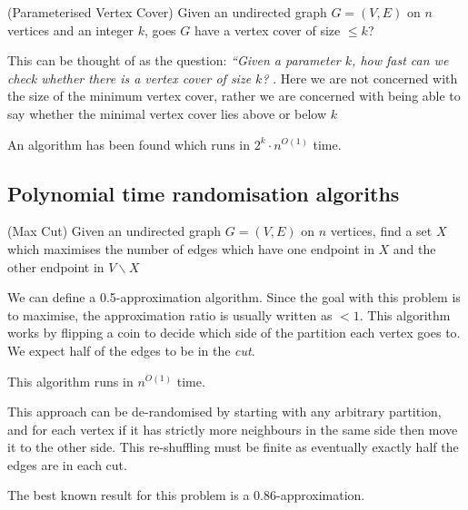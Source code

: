 \documentclass{article}
\begin{document}
\begin{definition}(Parameterised Vertex Cover)
 Given an undirected graph $G=(V,E)$ on $n$ vertices and an integer $k$, goes $G$ have a vertex cover of size $\leq k$?
\end{definition}

This can be thought of as the question: \textit{``Given a parameter $k$, how fast can we check whether there is a vertex cover of size $k$?} . Here we are not concerned with the size of the minimum vertex cover, rather we are concerned with being able to say whether the minimal vertex cover lies above or below $k$

An algorithm has been found which runs in $2^{k}\cdot n^{O(1)}$ time.

\subsection{Polynomial time randomisation algoriths}

\begin{definition}(Max Cut)
  Given an undirected graph $G=(V,E)$ on $n$ vertices, find a set $X$ which maximises the number of edges which have one endpoint in $X$ and the other endpoint in $V \backslash X$
\end{definition}


We can define a 0.5-approximation algorithm. Since the goal with this problem is to maximise, the approximation ratio is usually written as $<1$. This algorithm works by flipping a coin to decide which side of the partition each vertex goes to. We expect half of the edges to be in the \textit{cut}.

This algorithm runs in $n^{O(1)}$ time.

This approach can be de-randomised by starting with any arbitrary partition, and for each vertex if it has strictly more neighbours in the same side then move it to the other side. This re-shuffling must be finite as eventually exactly half the edges are in each cut.

The best known result for this problem is a 0.86-approximation.
\end{document}
